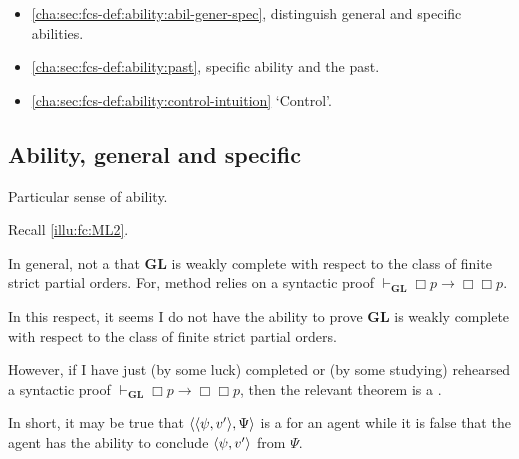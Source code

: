 \begin{note}
  \begin{itemize}[noitemsep]
  \item
    \autoref{cha:sec:fcs-def:ability:abil-gener-spec}, distinguish general and specific abilities.
  \item
    \autoref{cha:sec:fcs-def:ability:past}, specific ability and the past.
  \item
    \autoref{cha:sec:fcs-def:ability:control-intuition} `Control'.
  \end{itemize}
\end{note}

\subsection{Ability, general and specific}
\label{cha:sec:fcs-def:ability:abil-gener-spec}

\begin{note}
  Particular sense of ability.

  Recall \autoref{illu:fc:ML2}.

  In general, not a \fc{} that \(\mathbf{GL}\) is weakly complete with respect to the class of finite strict partial orders.
  For, method relies on a syntactic proof \(\vdash_{\mathbf{GL}} \Box p \rightarrow \Box \Box p\).

  In this respect, it seems I do not have the ability to prove \(\mathbf{GL}\) is weakly complete with respect to the class of finite strict partial orders.

  However, if I have just (by some luck) completed or (by some studying) rehearsed a syntactic proof \(\vdash_{\mathbf{GL}} \Box p \rightarrow \Box \Box p\), then the relevant theorem is a \fc{}.

  In short, it may be true that \(\langle \langle \psi, v' \rangle, \Psi \rangle\) is a \fc{} for an agent while it is false that the agent has the ability to conclude \(\langle \psi, v' \rangle\) from \(\Psi\).
\end{note}

